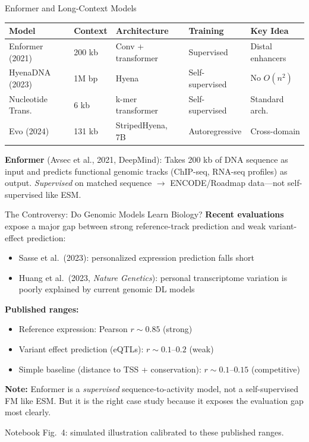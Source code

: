 \documentclass[aspectratio=169,10pt]{beamer}
\begin{document}
\begin{frame}{Enformer and Long-Context Models}
\begin{center}
\renewcommand{\arraystretch}{1.15}
{\small
\begin{tabular}{p{2.4cm}p{1.5cm}p{2.2cm}p{2cm}p{2.5cm}}
\toprule
\textbf{Model} & \textbf{Context} & \textbf{Architecture} & \textbf{Training} & \textbf{Key Idea} \\
\midrule
Enformer (2021) & 200 kb & Conv + transformer & Supervised & Distal enhancers \\
HyenaDNA (2023) & 1M bp & Hyena & Self-supervised & No $O(n^2)$ \\
Nucleotide Trans. & 6 kb & k-mer transformer & Self-supervised & Standard arch. \\
Evo (2024) & 131 kb & StripedHyena, 7B & Autoregressive & Cross-domain \\
\bottomrule
\end{tabular}}
\end{center}
\vspace{0.1em}
\textbf{Enformer} (Avsec et al., 2021, DeepMind): Takes 200 kb of DNA sequence as input and predicts functional genomic tracks (ChIP-seq, RNA-seq profiles) as output. \emph{Supervised} on matched sequence $\to$ ENCODE/Roadmap data---not self-supervised like ESM.
\end{frame}

\begin{frame}{The Controversy: Do Genomic Models Learn Biology?}
\textbf{Recent evaluations} expose a major gap between strong reference-track prediction and weak variant-effect prediction:
\begin{itemize}
    \item Sasse et al.\ (2023): personalized expression prediction falls short
    \item Huang et al.\ (2023, \textit{Nature Genetics}): personal transcriptome variation is poorly explained by current genomic DL models
\end{itemize}
\vspace{0.1em}

\textbf{Published ranges:}
\begin{itemize}
    \item Reference expression: Pearson $r \sim 0.85$ (strong)
    \item Variant effect prediction (eQTLs): $r \sim 0.1$--$0.2$ (weak)
    \item Simple baseline (distance to TSS + conservation): $r \sim 0.1$--$0.15$ (competitive)
\end{itemize}
\pause
\vspace{0.1em}
\textbf{Note:} Enformer is a \emph{supervised} sequence-to-activity model, not a self-supervised FM like ESM. But it is the right case study because it exposes the evaluation gap most clearly.

\vspace{0.1em}
{\small Notebook Fig.~4: simulated illustration calibrated to these published ranges.}
\end{frame}
\end{document}
